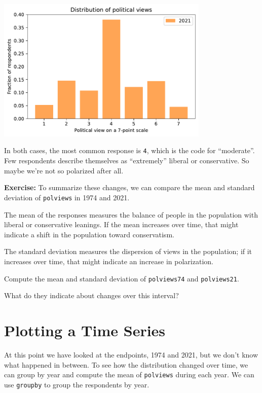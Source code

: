 \begin{center}
\includegraphics[width=4in]{chapters/02_polviews_files/02_polviews_34_0.pdf}
\end{center}

In both cases, the most common response is \passthrough{\lstinline!4!},
which is the code for ``moderate''. Few respondents describe themselves
as ``extremely'' liberal or conservative. So maybe we're not so
polarized after all.

\textbf{Exercise:} To summarize these changes, we can compare the mean
and standard deviation of \passthrough{\lstinline!polviews!} in 1974 and
2021.

The mean of the responses measures the balance of people in the
population with liberal or conservative leanings. If the mean increases
over time, that might indicate a shift in the population toward
conservatism.

The standard deviation measures the dispersion of views in the
population; if it increases over time, that might indicate an increase
in polarization.

Compute the mean and standard deviation of
\passthrough{\lstinline!polviews74!} and
\passthrough{\lstinline!polviews21!}.

What do they indicate about changes over this interval?

\hypertarget{plotting-a-time-series}{%
\section{Plotting a Time Series}\label{plotting-a-time-series}}

At this point we have looked at the endpoints, 1974 and 2021, but we
don't know what happened in between. To see how the distribution changed
over time, we can group by year and compute the mean of
\passthrough{\lstinline!polviews!} during each year. We can use
\passthrough{\lstinline!groupby!} to group the respondents by year.

